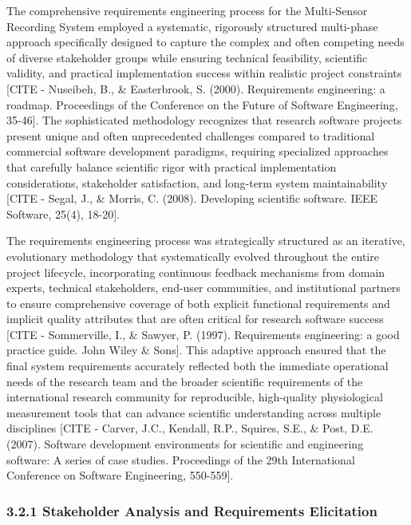 \documentclass[12pt,a4paper]{article}
\begin{document}
The comprehensive requirements engineering process for the Multi-Sensor Recording System employed a systematic,
rigorously structured multi-phase approach specifically designed to capture the complex and often competing needs of
diverse stakeholder groups while ensuring technical feasibility, scientific validity, and practical implementation
success within realistic project
constraints [CITE - Nuseibeh, B., \& Easterbrook, S. (2000). Requirements engineering: a roadmap. Proceedings of the Conference on the Future of Software Engineering, 35-46].
The sophisticated methodology recognizes that research software projects present unique and often unprecedented
challenges compared to traditional commercial software development paradigms, requiring specialized approaches that
carefully balance scientific rigor with practical implementation considerations, stakeholder satisfaction, and long-term
system
maintainability [CITE - Segal, J., \& Morris, C. (2008). Developing scientific software. IEEE Software, 25(4), 18-20].

The requirements engineering process was strategically structured as an iterative, evolutionary methodology that
systematically evolved throughout the entire project lifecycle, incorporating continuous feedback mechanisms from domain
experts, technical stakeholders, end-user communities, and institutional partners to ensure comprehensive coverage of
both explicit functional requirements and implicit quality attributes that are often critical for research software
success [CITE - Sommerville, I., \& Sawyer, P. (1997). Requirements engineering: a good practice guide. John Wiley \& Sons].
This adaptive approach ensured that the final system requirements accurately reflected both the immediate operational
needs of the research team and the broader scientific requirements of the international research community for
reproducible, high-quality physiological measurement tools that can advance scientific understanding across multiple
disciplines [CITE - Carver, J.C., Kendall, R.P., Squires, S.E., \& Post, D.E. (2007). Software development environments for scientific and engineering software: A series of case studies. Proceedings of the 29th International Conference on Software Engineering, 550-559].

\subsubsection{3.2.1 Stakeholder Analysis and Requirements Elicitation}
\end{document}
